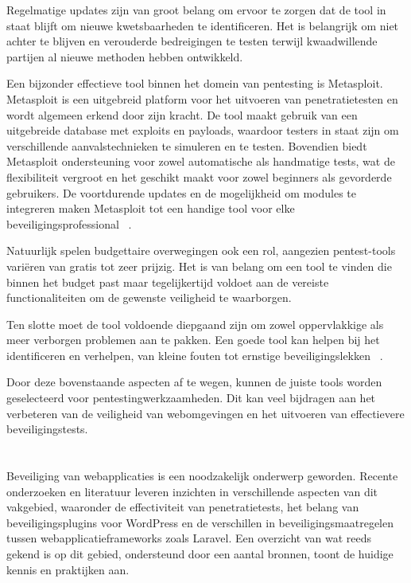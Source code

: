 Regelmatige updates zijn van groot belang om ervoor te zorgen dat de tool in staat blijft om nieuwe kwetsbaarheden te 
identificeren. Het is belangrijk om niet achter te blijven en verouderde bedreigingen te testen terwijl kwaadwillende 
partijen al nieuwe methoden hebben ontwikkeld.

Een bijzonder effectieve tool binnen het domein van pentesting is Metasploit. Metasploit is een uitgebreid platform voor het uitvoeren van 
penetratietesten en wordt algemeen erkend door zijn kracht. De tool maakt gebruik van een uitgebreide database met exploits en 
payloads, waardoor testers in staat zijn om verschillende aanvalstechnieken te simuleren en te testen. Bovendien biedt Metasploit ondersteuning 
voor zowel automatische als handmatige tests, wat de flexibiliteit vergroot en het geschikt maakt voor zowel beginners als gevorderde gebruikers. 
De voortdurende updates en de mogelijkheid om modules te integreren maken Metasploit tot een handige tool voor elke 
beveiligingsprofessional ~\autocite{Rani2019}. 

Natuurlijk spelen budgettaire overwegingen ook een rol, aangezien pentest-tools variëren van gratis tot zeer prijzig. Het 
is van belang om een tool te vinden die binnen het budget past maar tegelijkertijd voldoet aan de vereiste functionaliteiten
om de gewenste veiligheid te waarborgen.

Ten slotte moet de tool voldoende diepgaand zijn om zowel oppervlakkige als meer verborgen problemen aan te pakken. 
Een goede tool kan helpen bij het identificeren en verhelpen, van kleine fouten tot ernstige beveiligingslekken
~\autocite{Maji2022}.

Door deze bovenstaande aspecten af te wegen, kunnen de juiste tools worden geselecteerd voor pentestingwerkzaamheden. 
Dit kan veel bijdragen aan het verbeteren van de veiligheid van webomgevingen en het uitvoeren van effectievere beveiligingstests.

\section{}
\label{sec:wat-weten-we-uit-de-literatuur}
Beveiliging van webapplicaties is een noodzakelijk onderwerp geworden. Recente onderzoeken en literatuur leveren 
inzichten in verschillende aspecten van dit vakgebied, waaronder de effectiviteit van penetratietests, het belang van beveiligingsplugins voor WordPress en de verschillen 
in beveiligingsmaatregelen tussen webapplicatieframeworks zoals Laravel. Een overzicht van wat reeds gekend is op dit gebied, ondersteund door een aantal 
bronnen, toont de huidige kennis en praktijken aan.

